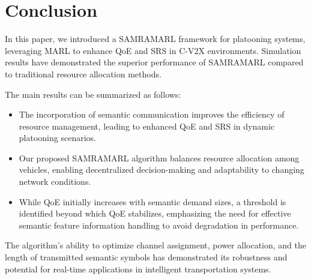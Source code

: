\documentclass[10pt, lettersize,journal]{IEEEtran}
\begin{document}
	\section{Conclusion}
	In this paper, we introduced a SAMRAMARL framework for platooning systems, leveraging MARL to enhance QoE and SRS in C-V2X environments. Simulation results have demonstrated the superior performance of SAMRAMARL compared to traditional resource allocation methods.
	
	The main results can be summarized as follows:
	\begin{itemize} 
		\item The incorporation of semantic communication improves the efficiency of resource management, leading to enhanced QoE and SRS in dynamic platooning scenarios. 
		\item Our proposed SAMRAMARL algorithm balances resource allocation among vehicles, enabling decentralized decision-making and adaptability to changing network conditions. 
		\item While QoE initially increases with semantic demand sizes, a threshold is identified beyond which QoE stabilizes, emphasizing the need for effective semantic feature information handling to avoid degradation in performance. 
	\end{itemize}
	The algorithm's ability to optimize channel assignment, power allocation, and the length of transmitted semantic symbols has demonstrated its robustness and potential for real-time applications in intelligent transportation systems.
	
	
	
	
	
	\nocite{*}
	
			
	
\end{document}
